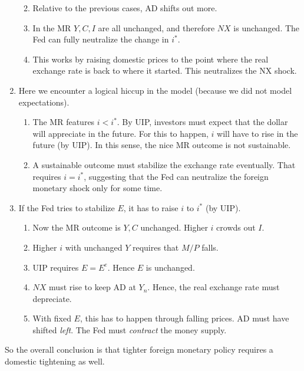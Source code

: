 \documentclass[]{article}
\begin{document}
\begin{enumerate}
  \begin{enumerate}
  \def\labelenumii{\arabic{enumii}.}
  \item
    Relative to the previous cases, AD shifts out more.
  \item
    In the MR \(Y,C,I\) are all unchanged, and therefore \(NX\) is
    unchanged. The Fed can fully neutralize the change in \(i^*\). 
  \item
    This works by raising domestic prices to the point where the real
    exchange rate is back to where it started. This neutralizes the NX
    shock.
  \end{enumerate}
\item
  Here we encounter a logical hiccup in the model (because we did not
  model expectations).

  \begin{enumerate}
  \def\labelenumii{\arabic{enumii}.}
  \item
    The MR features \(i < i^*\). By UIP, investors must expect that the
    dollar will appreciate in the future. For this to happen, \(i\) will
    have to rise in the future (by UIP). In this sense, the nice MR
    outcome is not sustainable.
  \item
    A sustainable outcome must stabilize the exchange rate eventually.
    That requires \(i = i^*\), suggesting that the Fed can neutralize
    the foreign monetary shock only for some time. 
  \end{enumerate}
\item
  If the Fed tries to stabilize \(E\), it has to raise \(i\) to \(i^*\)
  (by UIP).

  \begin{enumerate}
  \def\labelenumii{\arabic{enumii}.}
  \item
    Now the MR outcome is \(Y, C\) unchanged. Higher \(i\) crowds out
    \(I\). 
  \item
    Higher \(i\) with unchanged \(Y\) requires that \(M/P\) falls.
  \item
    UIP requires \(E = E^e\). Hence \(E\) is unchanged.
  \item
    \(NX\) must rise to keep AD at \(Y_n\). Hence, the real exchange
    rate must depreciate. 
  \item
    With fixed \(E\), this has to happen through falling prices. AD must
    have shifted \emph{left}. The Fed must \emph{contract} the money
    supply.
  \end{enumerate}
\end{enumerate}

So the overall conclusion is that tighter foreign monetary policy
requires a domestic tightening as well.
\end{document}
